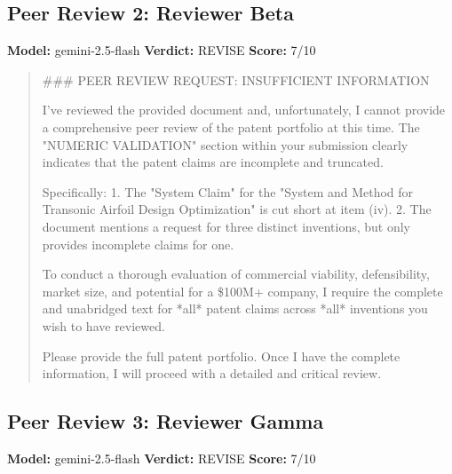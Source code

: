 \documentclass{article}
\begin{document}
\subsection{Peer Review 2: Reviewer Beta}
\textbf{Model:} gemini-2.5-flash \quad \textbf{Verdict:} REVISE \quad \textbf{Score:} 7/10

\begin{quote}
\#\#\# PEER REVIEW REQUEST: INSUFFICIENT INFORMATION

I've reviewed the provided document and, unfortunately, I cannot provide a comprehensive peer review of the patent portfolio at this time. The "NUMERIC VALIDATION" section within your submission clearly indicates that the patent claims are incomplete and truncated.

Specifically:
1.  The "System Claim" for the "System and Method for Transonic Airfoil Design Optimization" is cut short at item (iv).
2.  The document mentions a request for three distinct inventions, but only provides incomplete claims for one.

To conduct a thorough evaluation of commercial viability, defensibility, market size, and potential for a \$100M+ company, I require the complete and unabridged text for *all* patent claims across *all* inventions you wish to have reviewed.

Please provide the full patent portfolio. Once I have the complete information, I will proceed with a detailed and critical review.
\end{quote}

\subsection{Peer Review 3: Reviewer Gamma}
\textbf{Model:} gemini-2.5-flash \quad \textbf{Verdict:} REVISE \quad \textbf{Score:} 7/10
\end{document}
